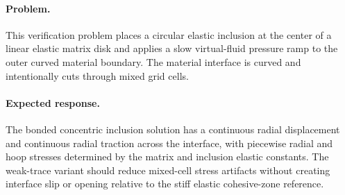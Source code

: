 \paragraph{Problem.}
This verification problem places a circular elastic inclusion at the center of a
linear elastic matrix disk and applies a slow virtual-fluid pressure ramp to the
outer curved material boundary.  The material interface is curved and
intentionally cuts through mixed grid cells.

\paragraph{Expected response.}
The bonded concentric inclusion solution has a continuous radial displacement
and continuous radial traction across the interface, with piecewise radial and
hoop stresses determined by the matrix and inclusion elastic constants.  The
weak-trace variant should reduce mixed-cell stress artifacts without creating
interface slip or opening relative to the stiff elastic cohesive-zone reference.

